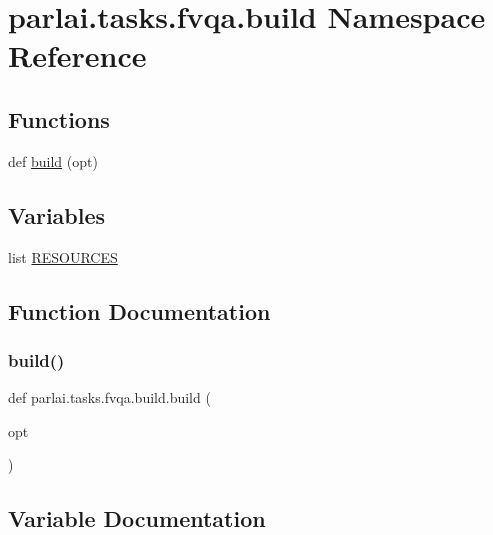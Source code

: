 \hypertarget{namespaceparlai_1_1tasks_1_1fvqa_1_1build}{}\section{parlai.\+tasks.\+fvqa.\+build Namespace Reference}
\label{namespaceparlai_1_1tasks_1_1fvqa_1_1build}
\subsection*{Functions}
\begin{DoxyCompactItemize}
\item 
def \hyperlink{namespaceparlai_1_1tasks_1_1fvqa_1_1build_a3a2e24cb615d980f27a566616af6292c}{build} (opt)
\end{DoxyCompactItemize}
\subsection*{Variables}
\begin{DoxyCompactItemize}
\item 
list \hyperlink{namespaceparlai_1_1tasks_1_1fvqa_1_1build_a3e436caffe57471e54ae132803852fe7}{R\+E\+S\+O\+U\+R\+C\+ES}
\end{DoxyCompactItemize}


\subsection{Function Documentation}
\mbox{\label{namespaceparlai_1_1tasks_1_1fvqa_1_1build_a3a2e24cb615d980f27a566616af6292c}} 
\subsubsection{\texorpdfstring{build()}{build()}}
{\footnotesize\ttfamily def parlai.\+tasks.\+fvqa.\+build.\+build (\begin{DoxyParamCaption}\item[{}]{opt }\end{DoxyParamCaption})}



\subsection{Variable Documentation}
\mbox{\label{namespaceparlai_1_1tasks_1_1fvqa_1_1build_a3e436caffe57471e54ae132803852fe7}} 
